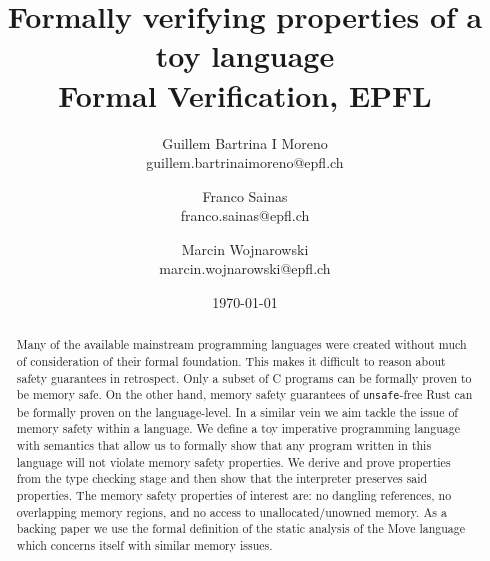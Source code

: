 \documentclass[notitlepage]{article}
\title{Formally verifying properties of a toy language\\\large Formal Verification, EPFL}
\author{
	Guillem Bartrina I Moreno \\ \normalsize guillem.bartrinaimoreno@epfl.ch \and
	Franco Sainas \\ \normalsize franco.sainas@epfl.ch \and
	Marcin Wojnarowski \\ \normalsize marcin.wojnarowski@epfl.ch
}
\date{\today}
\begin{document}
\maketitle

\begin{abstract}
	Many of the available mainstream programming languages were created without much of consideration of their formal foundation. This makes it difficult to reason about safety guarantees in retrospect. Only a subset of C programs can be formally proven to be memory safe. On the other hand, memory safety guarantees of \texttt{unsafe}-free Rust can be formally proven on the language-level\cite{10.1145/3158154}. In a similar vein we aim tackle the issue of memory safety within a language. We define a toy imperative programming language with semantics that allow us to formally show that any program written in this language will not violate memory safety properties. We derive and prove properties from the type checking stage and then show that the interpreter preserves said properties. The memory safety properties of interest are: no dangling references, no overlapping memory regions, and no access to unallocated/unowned memory. As a backing paper we use the formal definition of the static analysis of the Move language\cite{blackshear2022borrow} which concerns itself with similar memory issues.
\end{abstract}

\printbibliography
\end{document}

